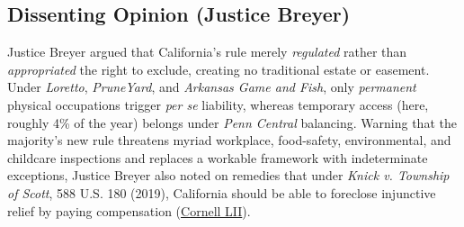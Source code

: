 \documentclass[12pt]{article}
\begin{document}
\subsection{Dissenting Opinion (Justice Breyer)}

Justice Breyer argued that California's rule merely \emph{regulated} rather than \emph{appropriated} the right to exclude, creating no traditional estate or easement. Under \textit{Loretto}, \textit{PruneYard}, and \textit{Arkansas Game and Fish}, only \emph{permanent} physical occupations trigger \emph{per se} liability, whereas temporary access (here, roughly 4\% of the year) belongs under \textit{Penn Central} balancing. Warning that the majority's new rule threatens myriad workplace, food-safety, environmental, and childcare inspections and replaces a workable framework with indeterminate exceptions, Justice Breyer also noted on remedies that under \textit{Knick v. Township of Scott}, 588 U.S. 180 (2019), California should be able to foreclose injunctive relief by paying compensation (\href{https://www.law.cornell.edu/supremecourt/text/20-107}{Cornell LII}).
\end{document}
